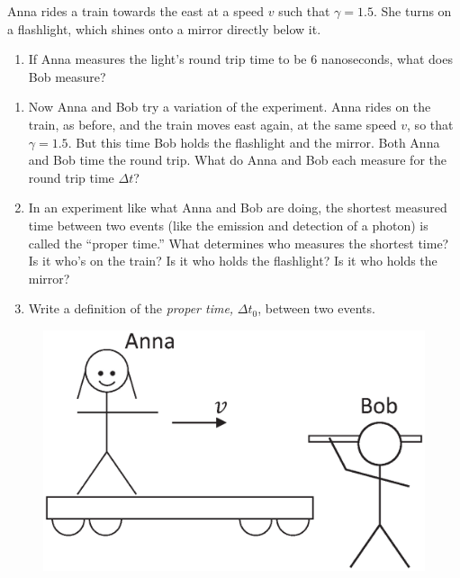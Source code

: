 Anna rides a train towards the east at a speed $v$ such that $\gamma=1.5$.  She turns on a flashlight, which shines onto a mirror directly below it.

\begin{enumerate}[labparts]
\item If Anna measures the light's round trip time to be 6 nanoseconds, what does Bob measure?
\answerspace{0.5in}
\end{enumerate}

\begin{enumerate}
\item Now Anna and Bob try a variation of the experiment.  Anna rides on the train, as before, and the train moves east again, at the same speed $v$, so that $\gamma=1.5$.  But this time Bob holds the flashlight and the mirror.  Both Anna and Bob time the round trip.  What do Anna and Bob each measure for the round trip time $\Delta t$?
\answerspace{0.5in}

\item In an experiment like what Anna and Bob are doing, the shortest measured time between two events (like the emission and detection of a photon) is called the ``proper time.''  What determines who measures the shortest time? Is it who's on the train?  Is it who holds the flashlight?  Is it who holds the mirror?
\answerspace{0.5in}

\item Write a definition of the \textit{proper time,} $\Delta t_0$, between two events.
\answerspace{0.5in}
\end{enumerate}

\begin{figure}
\begin{center}
\vspace{-0.4in}
\includegraphics[scale=0.4]{time_dilation_length_contraction/anna_and_bob2.eps}
\end{center}
\end{figure}

